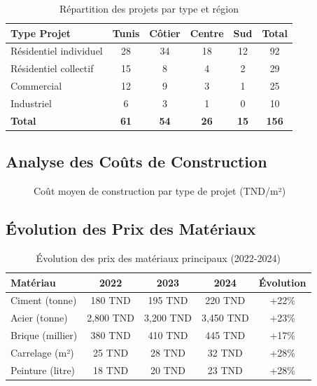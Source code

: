 \documentclass[12pt, a4paper]{report}
\begin{document}
\begin{table}[h]
\centering
\caption{Répartition des projets par type et région}
\begin{tabular}{|l|c|c|c|c|c|}
\hline
\textbf{Type Projet} & \textbf{Tunis} & \textbf{Côtier} & \textbf{Centre} & \textbf{Sud} & \textbf{Total} \\
\hline
Résidentiel individuel & 28 & 34 & 18 & 12 & 92 \\
\hline
Résidentiel collectif & 15 & 8 & 4 & 2 & 29 \\
\hline
Commercial & 12 & 9 & 3 & 1 & 25 \\
\hline
Industriel & 6 & 3 & 1 & 0 & 10 \\
\hline
\textbf{Total} & \textbf{61} & \textbf{54} & \textbf{26} & \textbf{15} & \textbf{156} \\
\hline
\end{tabular}
\end{table}

\subsection{Analyse des Coûts de Construction}

\begin{figure}[h]
\centering
{}
\caption{Coût moyen de construction par type de projet (TND/m²)}
\end{figure}

\subsection{Évolution des Prix des Matériaux}

\begin{table}[h]
\centering
\caption{Évolution des prix des matériaux principaux (2022-2024)}
\begin{tabular}{|l|c|c|c|c|}
\hline
\textbf{Matériau} & \textbf{2022} & \textbf{2023} & \textbf{2024} & \textbf{Évolution} \\
\hline
Ciment (tonne) & 180 TND & 195 TND & 220 TND & +22\% \\
\hline
Acier (tonne) & 2,800 TND & 3,200 TND & 3,450 TND & +23\% \\
\hline
Brique (millier) & 380 TND & 410 TND & 445 TND & +17\% \\
\hline
Carrelage (m²) & 25 TND & 28 TND & 32 TND & +28\% \\
\hline
Peinture (litre) & 18 TND & 20 TND & 23 TND & +28\% \\
\hline
\end{tabular}
\end{table}
\end{document}
